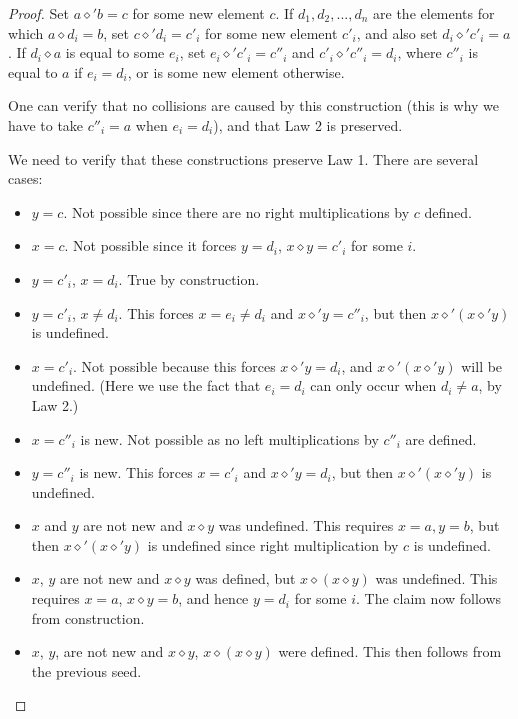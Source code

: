 \begin{proof}
Set $a \diamond' b = c$ for some new element $c$. If $d_1,d_2,...,d_n$ are the elements for which $a \diamond d_i = b$, set $c \diamond' d_i = c'_i$ for some new element $c'_i$, and also set
$d_i \diamond' c'_i = a$. If $d_i \diamond a$ is equal to some $e_i$, set $e_i \diamond' c'_i = c''_i$ and $c'_i \diamond' c''_i = d_i$,
where $c''_i$ is equal to $a$ if $e_i = d_i$, or is some new element otherwise.

One can verify that no collisions are caused by this construction (this is why we have to take $c''_i=a$ when $e_i=d_i$),
 and that Law 2 is preserved.

We need to verify that these constructions preserve Law 1.  There are several cases:
\begin{itemize}

  \item $y=c$.  Not possible since there are no right multiplications by $c$ defined.
  \item $x=c$.  Not possible since it forces $y = d_i$, $x \diamond y = c'_i$ for some $i$.
  \item $y=c'_i$, $x = d_i$.  True by construction.
  \item $y=c'_i$, $x \neq d_i$.  This forces $x = e_i \neq d_i$ and $x \diamond' y = c''_i$, but then $x \diamond' (x \diamond' y)$ is undefined.
  \item $x=c'_i$.  Not possible because this forces $x \diamond' y = d_i$, and $x \diamond' (x \diamond' y)$ will be undefined.
 (Here we use the fact that $e_i=d_i$ can only occur when $d_i \neq a$, by Law 2.)
 \item  $x = c''_i$ is new.  Not possible as no left multiplications by $c''_i$ are defined.
 \item $y=c''_i$ is new.  This forces $x = c'_i$ and $x \diamond' y = d_i$, but then $x \diamond' (x \diamond' y)$ is undefined.
 \item $x$ and $y$ are not new and $x \diamond y$ was undefined. This requires $x=a, y=b$, but then $x \diamond' (x \diamond' y)$
is undefined since right multiplication by $c$ is undefined.
\item $x$, $y$ are not new and $x \diamond y$ was defined, but $x \diamond (x \diamond y)$ was undefined.
This requires $x=a$, $x \diamond y = b$, and hence $y = d_i$ for some $i$.  The claim now follows from construction.
\item  $x$, $y$, are not new and $x \diamond y$, $x \diamond (x \diamond y)$ were defined. This then follows from the previous seed.
\end{itemize}
\end{proof}

